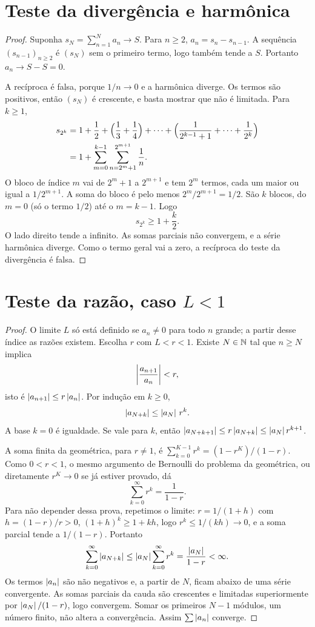 \documentclass[11pt,a4paper]{article}
\begin{document}
\section{Teste da divergência e harmônica}

\begin{proof}
Suponha \(s_N=\sum_{n=1}^N a_n\to S\). Para \(n\ge 2\), \(a_n=s_n-s_{n-1}\). A sequência \((s_{n-1})_{n\ge 2}\) é \((s_N)\) sem o primeiro termo, logo também tende a \(S\). Portanto \(a_n\to S-S=0\).

A recíproca é falsa, porque \(1/n\to 0\) e a harmônica diverge. Os termos são positivos, então \((s_N)\) é crescente, e basta mostrar que não é limitada. Para \(k\ge 1\),
\begin{align*}
s_{2^k}
&=1+\frac12+\Bigl(\frac13+\frac14\Bigr)+\cdots+\Bigl(\frac{1}{2^{k-1}+1}+\cdots+\frac{1}{2^k}\Bigr)\\
&=1+\sum_{m=0}^{k-1}\sum_{n=2^m+1}^{2^{m+1}}\frac{1}{n}.
\end{align*}
O bloco de índice \(m\) vai de \(2^m+1\) a \(2^{m+1}\) e tem \(2^m\) termos, cada um maior ou igual a \(1/2^{m+1}\). A soma do bloco é pelo menos \(2^m/2^{m+1}=1/2\). São \(k\) blocos, do \(m=0\) (só o termo \(1/2\)) até o \(m=k-1\). Logo
\[
s_{2^k}\ge 1+\frac{k}{2}.
\]
O lado direito tende a infinito. As somas parciais não convergem, e a série harmônica diverge. Como o termo geral vai a zero, a recíproca do teste da divergência é falsa.
\end{proof}

\section{Teste da razão, caso \(L<1\)}

\begin{proof}
O limite \(L\) só está definido se \(a_n\neq 0\) para todo \(n\) grande; a partir desse índice as razões existem. Escolha \(r\) com \(L<r<1\). Existe \(N\in\mathbb{N}\) tal que \(n\ge N\) implica
\[
\left\lvert \frac{a_{n+1}}{a_n} \right\rvert<r,
\]
isto é \(\left\lvert a_{n+1} \right\rvert\le r\left\lvert a_n \right\rvert\). Por indução em \(k\ge 0\),
\[
\left\lvert a_{N+k} \right\rvert\le\left\lvert a_N \right\rvert\,r^k.
\]
A base \(k=0\) é igualdade. Se vale para \(k\), então \(\left\lvert a_{N+k+1} \right\rvert\le r\left\lvert a_{N+k} \right\rvert\le\left\lvert a_N \right\rvert r^{k+1}\).

A soma finita da geométrica, para \(r\neq 1\), é \(\sum_{k=0}^{K-1} r^k=(1-r^K)/(1-r)\). Como \(0<r<1\), o mesmo argumento de Bernoulli do problema da geométrica, ou diretamente \(r^K\to 0\) se já estiver provado, dá
\[
\sum_{k=0}^\infty r^k=\frac{1}{1-r}.
\]
Para não depender dessa prova, repetimos o limite: \(r=1/(1+h)\) com \(h=(1-r)/r>0\), \((1+h)^k\ge 1+kh\), logo \(r^k\le 1/(kh)\to 0\), e a soma parcial tende a \(1/(1-r)\). Portanto
\[
\sum_{k=0}^\infty\left\lvert a_{N+k} \right\rvert
\le\left\lvert a_N \right\rvert\sum_{k=0}^\infty r^k
=\frac{\left\lvert a_N \right\rvert}{1-r}<\infty.
\]
Os termos \(\left\lvert a_n \right\rvert\) são não negativos e, a partir de \(N\), ficam abaixo de uma série convergente. As somas parciais da cauda são crescentes e limitadas superiormente por \(\left\lvert a_N \right\rvert/(1-r)\), logo convergem. Somar os primeiros \(N-1\) módulos, um número finito, não altera a convergência. Assim \(\sum\left\lvert a_n \right\rvert\) converge.
\end{proof}
\end{document}
